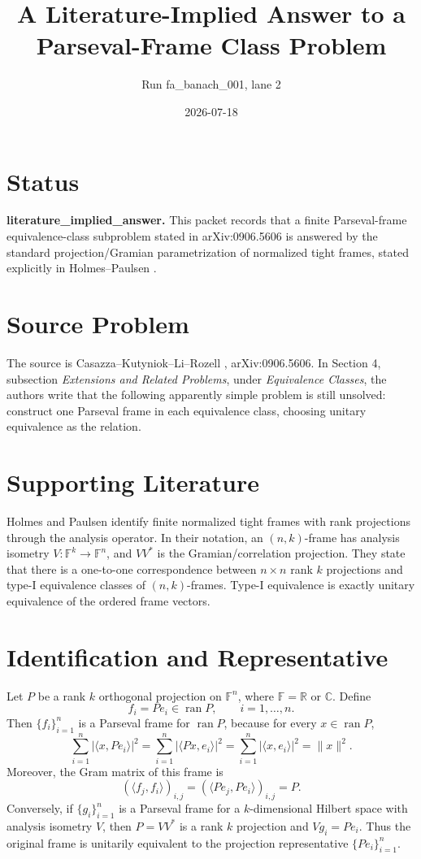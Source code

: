 \documentclass[11pt]{article}
\title{A Literature-Implied Answer to a Parseval-Frame Class Problem}
\author{Run fa\_banach\_001, lane 2}
\date{2026-07-18}
\begin{document}
\maketitle

\section*{Status}

\textbf{literature\_implied\_answer.} This packet records that a finite
Parseval-frame equivalence-class subproblem stated in arXiv:0906.5606 is
answered by the standard projection/Gramian parametrization of normalized tight
frames, stated explicitly in Holmes--Paulsen \cite{holmespaulsen}.

\section*{Source Problem}

The source is Casazza--Kutyniok--Li--Rozell \cite{cklr}, arXiv:0906.5606.
In Section 4, subsection \emph{Extensions and Related Problems}, under
\emph{Equivalence Classes}, the authors write that the following apparently
simple problem is still unsolved: construct one Parseval frame in each
equivalence class, choosing unitary equivalence as the relation.

\section*{Supporting Literature}

Holmes and Paulsen \cite{holmespaulsen} identify finite normalized tight frames
with rank projections through the analysis operator. In their notation, an
\((n,k)\)-frame has analysis isometry \(V:\mathbb F^k\to\mathbb F^n\), and
\(VV^*\) is the Gramian/correlation projection. They state that there is a
one-to-one correspondence between \(n\times n\) rank \(k\) projections and
type-I equivalence classes of \((n,k)\)-frames. Type-I equivalence is exactly
unitary equivalence of the ordered frame vectors.

\section*{Identification and Representative}

Let \(P\) be a rank \(k\) orthogonal projection on \(\mathbb F^n\), where
\(\mathbb F=\mathbb R\) or \(\mathbb C\). Define
\[
  f_i=P e_i\in \operatorname{ran} P,\qquad i=1,\ldots,n.
\]
Then \(\{f_i\}_{i=1}^n\) is a Parseval frame for \(\operatorname{ran}P\), because
for every \(x\in\operatorname{ran}P\),
\[
  \sum_{i=1}^n |\langle x,Pe_i\rangle|^2
  =
  \sum_{i=1}^n |\langle Px,e_i\rangle|^2
  =
  \sum_{i=1}^n |\langle x,e_i\rangle|^2
  =
  \|x\|^2.
\]
Moreover, the Gram matrix of this frame is
\[
  (\langle f_j,f_i\rangle)_{i,j}
  =
  (\langle Pe_j,Pe_i\rangle)_{i,j}
  =
  P.
\]
Conversely, if \(\{g_i\}_{i=1}^n\) is a Parseval frame for a \(k\)-dimensional
Hilbert space with analysis isometry \(V\), then \(P=VV^*\) is a rank \(k\)
projection and \(Vg_i=Pe_i\). Thus the original frame is unitarily equivalent
to the projection representative \(\{Pe_i\}_{i=1}^n\).
\end{document}
